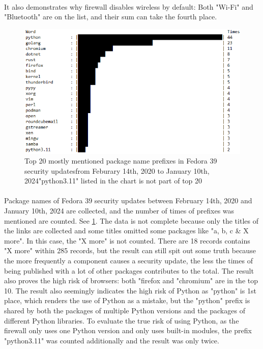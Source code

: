 \documentclass[mscthesis]{usiinfthesis}
\begin{document}
\paragraph{}
It also demonstrates why firewall disables wireless by default: Both "Wi-Fi" and "Bluetooth" are on the list, and their sum can take the fourth place.
\begin{figure}[H]
  \includegraphics[width=\textwidth]{data/fedora_39_security_updates/result.png}
  \caption{Top 20 mostly mentioned package name prefixes in Fedora 39 security updates\newline from Feburary 14th, 2020 to January 10th, 2024\newline "python3.11" listed in the chart is not part of top 20}
  \label{fig:fedora-sec-update}
\end{figure}
\paragraph{}
Package names of Fedora 39 security updates between February 14th, 2020 and January 10th, 2024 are collected, and the number of times of prefixes was mentioned are counted. See \cref{fig:fedora-sec-update}. The data is not complete because only the titles of the links are collected and some titles omitted some packages like "a, b, c \& X more". In this case, the "X more" is not counted. There are 18 records contains "X more" within 285 records, but the result can still spit out some truth because the more frequently a component causes a security update, the less the times of being published with a lot of other packages contributes to the total. The result also proves the high risk of browsers: both "firefox and "chromium" are in the top 10. The result also seemingly indicates the high risk of Python as "python" is 1st place, which renders the use of Python as a mistake, but the "python" prefix is shared by both the packages of multiple Python versions and the packages of different Python libraries. To evaluate the true risk of using Python, as the firewall only uses one Python version and only uses built-in modules, the prefix "python3.11" was counted additionally and the result was only twice.
\end{document}
